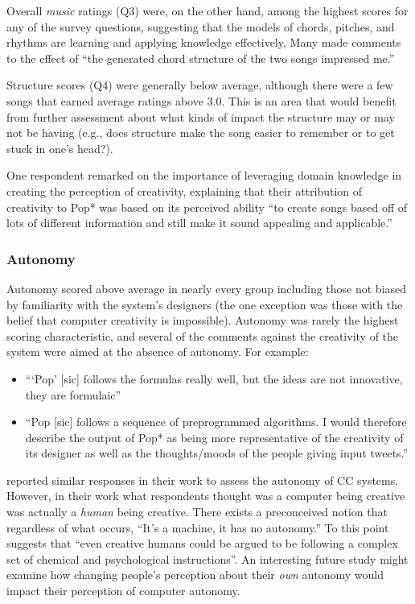 \documentclass[phd,electronic,oneside,twosidetoc,letterpaper,chaptercenter,parttop,lol,lof,lot]{byumsphd}
\begin{document}
Overall \textit{music} ratings (Q3) were, on the other hand, among the highest scores for any of the survey questions, suggesting that the models of chords, pitches, and rhythms are learning and applying knowledge effectively. Many made comments to the effect of ``the generated chord structure of the two songs impressed me.''

Structure scores (Q4) were generally below average, although there were a few songs that earned average ratings above 3.0. This is an area that would benefit from further assessment about what kinds of impact the structure may or may not be having (e.g., does structure make the song easier to remember or to get stuck in one's head?).

One respondent remarked on the importance of leveraging domain knowledge in creating the perception of creativity, explaining that their attribution of creativity to Pop* was based on its perceived ability ``to create songs based off of lots of different information and still make it sound appealing and applicable.''

\subsubsection{Autonomy}

Autonomy scored above average in nearly every group including those not biased by familiarity with the system's designers (the one exception was those with the belief that computer creativity is impossible). Autonomy was rarely the highest scoring characteristic, and several of the comments against the creativity of the system were aimed at the absence of autonomy. For example:

\begin{itemize}
\item ```Pop' [sic] follows the formulas really well, but the ideas are not innovative, they are formulaic''
\item ``Pop [sic] follows a sequence of preprogrammed algorithms.  I would therefore describe the output of Pop* as being more representative of the creativity of its designer as well as the thoughts/moods of the people giving input tweets.''
\end{itemize}

\cite{mumford2015man} reported similar responses in their work to assess the autonomy of CC systems. However, in their work what respondents thought was a computer being creative was actually a \textit{human} being creative. There exists a preconceived notion that regardless of what occurs, ``It's a machine, it has no autonomy.'' To this point \cite{mumford2015man} suggests that ``even creative humans could be argued to be following a complex set of chemical and psychological instructions''. An interesting future study might examine how changing people's perception about their \textit{own} autonomy would impact their perception of computer autonomy.
\end{document}
